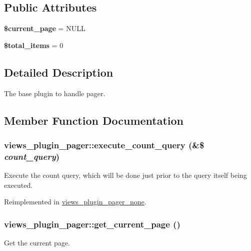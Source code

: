\subsection*{Public Attributes}
\begin{DoxyCompactItemize}
\item 
\hypertarget{classviews__plugin__pager_a9cf7b998b06e00af510f0a4a92f4d327}{
{\bfseries \$current\_\-page} = NULL}
\label{classviews__plugin__pager_a9cf7b998b06e00af510f0a4a92f4d327}

\item 
\hypertarget{classviews__plugin__pager_a235c954cfbb14255125df00eab35cb74}{
{\bfseries \$total\_\-items} = 0}
\label{classviews__plugin__pager_a235c954cfbb14255125df00eab35cb74}

\end{DoxyCompactItemize}


\subsection{Detailed Description}
The base plugin to handle pager. 

\subsection{Member Function Documentation}
\hypertarget{classviews__plugin__pager_a6d6e0ff79b5744f88a47d932ec68cfeb}{
\subsubsection[{execute\_\-count\_\-query}]{\setlength{\rightskip}{0pt plus 5cm}views\_\-plugin\_\-pager::execute\_\-count\_\-query (\&\$ {\em count\_\-query})}}
\label{classviews__plugin__pager_a6d6e0ff79b5744f88a47d932ec68cfeb}
Execute the count query, which will be done just prior to the query itself being executed. 

Reimplemented in \hyperlink{classviews__plugin__pager__none_a7bcc11b430579941eadc1a797da2eda0}{views\_\-plugin\_\-pager\_\-none}.\hypertarget{classviews__plugin__pager_a6e9c4827b565d7a7c7d424669d736493}{
\subsubsection[{get\_\-current\_\-page}]{\setlength{\rightskip}{0pt plus 5cm}views\_\-plugin\_\-pager::get\_\-current\_\-page ()}}
\label{classviews__plugin__pager_a6e9c4827b565d7a7c7d424669d736493}
Get the current page.

